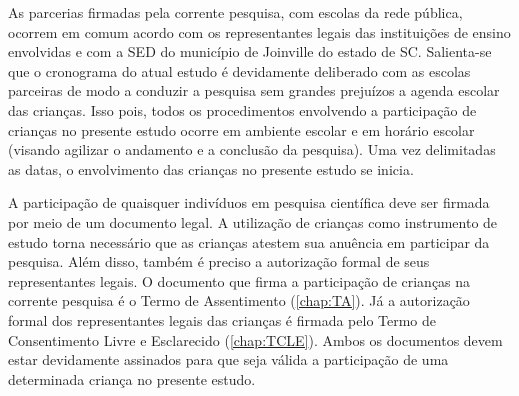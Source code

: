 As parcerias firmadas pela corrente pesquisa, com escolas da rede pública, ocorrem em comum acordo com os representantes legais das instituições de ensino envolvidas e com a \ac{SED} do município de Joinville do estado de \ac{SC}. %
Salienta-se que o cronograma do atual estudo é devidamente deliberado com as escolas parceiras de modo a conduzir a pesquisa sem grandes prejuízos a agenda escolar das crianças. Isso pois, todos os procedimentos envolvendo a participação de crianças no presente estudo ocorre em ambiente escolar e em horário escolar (visando agilizar o andamento e a conclusão da pesquisa). Uma vez delimitadas as datas, o envolvimento das crianças no presente estudo se inicia. 

A participação de quaisquer indivíduos em pesquisa científica deve ser firmada por meio de um documento legal. A utilização de crianças como instrumento de estudo torna necessário que as crianças atestem sua anuência em participar da pesquisa. Além disso, também é preciso a autorização formal de seus representantes legais. O documento que firma a participação de crianças na corrente pesquisa é o Termo de Assentimento (\autoref{chap:TA}). Já a autorização formal dos representantes legais das crianças é firmada pelo Termo de Consentimento Livre e Esclarecido (\autoref{chap:TCLE}). Ambos os documentos devem estar devidamente assinados para que seja válida a participação de uma determinada criança no presente estudo. %


